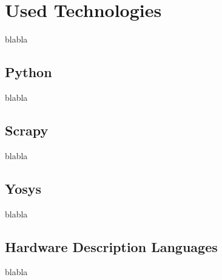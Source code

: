 \section{Used Technologies}
blabla

\subsection{Python}
blabla 

\subsection{Scrapy}
blabla

\subsection{Yosys}
blabla

\subsection{Hardware Description Languages}
blabla

